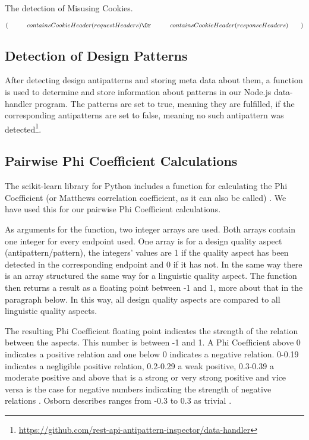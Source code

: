 \begin{algorithm}
\caption{The detection of Misusing Cookies.}
\begin{algorithmic}
\State \Return $(\newline
\hspace*{3em} containsCookieHeader(requestHeaders) \Or \newline 
\hspace*{3em} containsCookieHeader(responseHeaders) \newline
\hspace*{2em})$
\EndFunction
\end{algorithmic}
\label{Misusing Cookies algorithm}
\end{algorithm}

\clearpage

\subsection{Detection of Design Patterns}

After detecting design antipatterns and storing meta data about them, a function is used to determine and store information about patterns in our Node.js data-handler program. The patterns are set to true, meaning they are fulfilled, if the corresponding antipatterns are set to false, meaning no such antipattern was detected\footnote{\url{https://github.com/rest-api-antipattern-inspector/data-handler}}.

\subsection{Pairwise Phi Coefficient Calculations} \label{pairphico}

The scikit-learn library for Python includes a function for calculating the Phi Coefficient (or Matthews correlation coefficient, as it can also be called) \cite{scikitmcc}. We have used this for our pairwise Phi Coefficient calculations. 

As arguments for the function, two integer arrays are used. Both arrays contain one integer for every endpoint used. One array is for a design quality aspect (antipattern/pattern), the integers' values are 1 if the quality aspect has been detected in the corresponding endpoint and 0 if it has not. In the same way there is an array structured the same way for a linguistic quality aspect. The function then returns a result as a floating point between -1 and 1, more about that in the paragraph below. In this way, all design quality aspects are compared to all linguistic quality aspects.

The resulting Phi Coefficient floating point indicates the strength of the relation between the aspects. This number is between -1 and 1. A Phi Coefficient above 0 indicates a positive relation and one below 0 indicates a negative relation. 0-0.19 indicates a negligible positive relation, 0.2-0.29 a weak positive, 0.3-0.39 a moderate positive and above that is a strong or very strong positive and vice versa is the case for negative numbers indicating the strength of negative relations \cite{phico}. Osborn describes ranges from -0.3 to 0.3 as trivial \cite{Osborn}. 

\newpage
